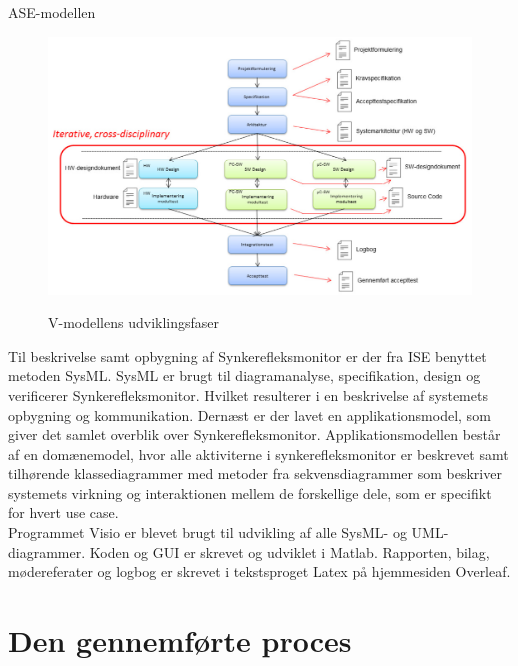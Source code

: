 ASE-modellen
\begin{figure}[H]
\centering
{\includegraphics[width=\textwidth]
{Figure/asemodel}}
\caption{V-modellens udviklingsfaser\cite{IngenirhjskolenAarhusUniversitetVejledning2}}
\label{asemodel}
\end{figure}



Til beskrivelse samt opbygning af Synkerefleksmonitor er der fra ISE benyttet metoden SysML. SysML er brugt til diagramanalyse, specifikation, design og verificerer Synkerefleksmonitor. Hvilket resulterer i en beskrivelse af systemets opbygning og kommunikation. Dernæst er der lavet en applikationsmodel, som giver det samlet overblik over Synkerefleksmonitor. Applikationsmodellen består af en domænemodel, hvor alle aktiviterne i synkerefleksmonitor er beskrevet samt tilhørende klassediagrammer med metoder fra sekvensdiagrammer som beskriver systemets virkning og interaktionen mellem de forskellige dele, som er specifikt for hvert use case.\\

Programmet Visio er blevet brugt til udvikling af alle SysML- og UML-diagrammer. Koden og GUI er skrevet og udviklet i Matlab. Rapporten, bilag, mødereferater og logbog er skrevet i tekstsproget Latex på hjemmesiden Overleaf. 

\section{Den gennemførte proces}

